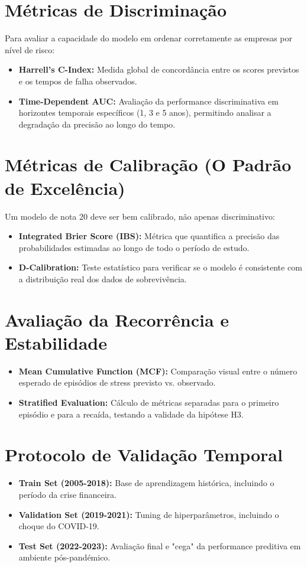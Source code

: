 \section{Métricas de Discriminação}

Para avaliar a capacidade do modelo em ordenar corretamente as empresas por nível de risco:
\begin{itemize}
    \item \textbf{Harrell's C-Index:} Medida global de concordância entre os scores previstos e os tempos de falha observados.
    \item \textbf{Time-Dependent AUC:} Avaliação da performance discriminativa em horizontes temporais específicos (1, 3 e 5 anos), permitindo analisar a degradação da precisão ao longo do tempo.
\end{itemize}

\section{Métricas de Calibração (O Padrão de Excelência)}

Um modelo de nota 20 deve ser bem calibrado, não apenas discriminativo:
\begin{itemize}
    \item \textbf{Integrated Brier Score (IBS):} Métrica que quantifica a precisão das probabilidades estimadas ao longo de todo o período de estudo.
    \item \textbf{D-Calibration:} Teste estatístico para verificar se o modelo é consistente com a distribuição real dos dados de sobrevivência.
\end{itemize}

\section{Avaliação da Recorrência e Estabilidade}

\begin{itemize}
    \item \textbf{Mean Cumulative Function (MCF):} Comparação visual entre o número esperado de episódios de stress previsto vs. observado.
    \item \textbf{Stratified Evaluation:} Cálculo de métricas separadas para o primeiro episódio e para a recaída, testando a validade da hipótese H3.
\end{itemize}

\section{Protocolo de Validação Temporal}

\begin{itemize}
    \item \textbf{Train Set (2005-2018):} Base de aprendizagem histórica, incluindo o período da crise financeira.
    \item \textbf{Validation Set (2019-2021):} Tuning de hiperparâmetros, incluindo o choque do COVID-19.
    \item \textbf{Test Set (2022-2023):} Avaliação final e "cega" da performance preditiva em ambiente pós-pandémico.
\end{itemize}
